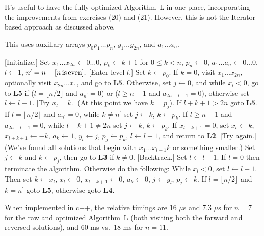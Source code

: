 \vskip 0.1in

\noindent It's useful to have the fully optimized Algorithm~L in one place, 
incorporating the improvements from exercises (20) and (21).   However, this
is not the Iterator based approach as discussed above.

\noindent This uses auxillary arrays $p_0 p_1 \ldots p_n$, $y_1 \ldots y_{2n}$, 
and $a_1 \ldots a_n$.

 [Initialize.] Set $x_1 \ldots x_{2 n} \leftarrow 0 
\ldots 0$, $p_k \leftarrow k + 1$ for $0 \leq k < n$, $p_n \leftarrow 0$, 
$a_{1} \ldots a_{n} \leftarrow 0 \ldots 0$, $l \leftarrow 1$,
$n^{\prime} = n - [n \rm{\, is\, even}].$
\vskip 0.05in
 [Enter level $l$.] Set $k \gets p_0$.  If $k = 0$, visit
$x_1 \ldots x_{2n}$, optionally visit $x_{2n} \ldots x_1$, and 
go to {\bf L5}.  Otherwise, set $j \leftarrow 0$, and
while $x_l < 0$, go to {\bf L5} if ($l = \lfloor n / 2 \rfloor$ and 
$a_{n^{\prime}} = 0$) or ($l \ge n - 1$ and $a_{2n - l - 1} = 0$), otherwise
set $l \leftarrow l + 1$.
\vskip 0.05in
 [Try $x_l = k$.] (At this point we have $k = p_j$).  
If $l + k + 1 > 2n$ goto {\bf L5}.  If $l = \lfloor n / 2 \rfloor$ and 
$a_{n^{\prime}} = 0$, while $k \ne n^{\prime}$ set $j \leftarrow k$, 
$k \leftarrow p_k$.  If $l \ge n - 1$ and $a_{2n - l - 1} = 0$, while 
$l + k + 1 \ne 2 n $ set $j \leftarrow k$, $k \leftarrow p_k$.  If 
$x_{l + k + 1} = 0$, set $x_l \leftarrow k$, $x_{l + k + 1} \leftarrow - k$,
$a_k \leftarrow 1$, $y_l \leftarrow j$, $p_j \leftarrow p_k$, 
$l \leftarrow l + 1$, and return to {\bf L2}.
\vskip 0.05in
 [Try again.] (We've found all solutions that begin with 
$x_1 \ldots x_{l-1} k$ or something smaller.) Set $j \leftarrow k$ and 
$k \leftarrow p_j$, then go to {\bf L3} if $k \ne 0$.
\vskip 0.05in
 [Backtrack.] Set $l \leftarrow l - 1$.   If $l = 0$ then 
terminate the algorithm. Otherwise do the following: While $x_l < 0$, set 
$l \leftarrow l - 1$.  Then set $k \leftarrow x_l$, $x_l \leftarrow 0$, 
$x_{l + k + 1} \leftarrow 0$, $a_k \leftarrow 0$, $j \leftarrow y_l$, 
$p_j \leftarrow k$.  If $l = \lfloor n / 2 \rfloor$ and $k = n^{\prime}$
goto {\bf L5}, otherwise goto {\bf L4}.
\vskip 0.1in

\noindent When implemented in c++, the relative timings are 16 $\mu$s and 7.3 $\mu$s 
for $n = 7$ for the raw and optimized Algorithm~L (both visiting both the 
forward and reversed solutions), and 60 ms vs.\ 18 ms for $n = 11$.

\bye

\bye